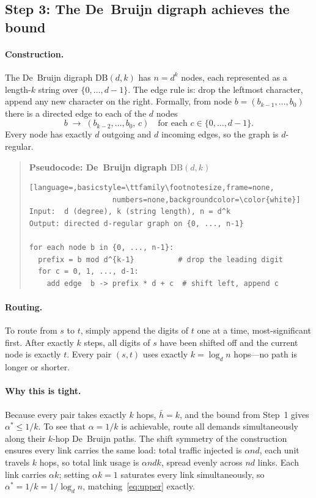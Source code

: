 \documentclass[11pt]{article}
\begin{document}
\subsection*{Step 3: The De~Bruijn digraph achieves the bound}

\paragraph{Construction.}
The De~Bruijn digraph $\mathrm{DB}(d,k)$ has $n = d^k$ nodes, each
represented as a length-$k$ string over $\{0,\ldots,d-1\}$. The edge
rule is: drop the leftmost character, append any new character on the
right. Formally, from node $b = (b_{k-1},\ldots,b_0)$ there is a
directed edge to each of the $d$ nodes
\[
b \;\longrightarrow\; (b_{k-2},\ldots,b_0,\,c) \quad \text{for each }
c \in \{0,\ldots,d-1\}.
\]
Every node has exactly $d$ outgoing and $d$ incoming edges, so the
graph is $d$-regular.

\begin{quote}\footnotesize
\textbf{Pseudocode: De~Bruijn digraph $\mathrm{DB}(d,k)$}
\begin{lstlisting}[language=,basicstyle=\ttfamily\footnotesize,frame=none,
                   numbers=none,backgroundcolor=\color{white}]
Input:  d (degree), k (string length), n = d^k
Output: directed d-regular graph on {0, ..., n-1}

for each node b in {0, ..., n-1}:
  prefix = b mod d^{k-1}          # drop the leading digit
  for c = 0, 1, ..., d-1:
    add edge  b -> prefix * d + c  # shift left, append c
\end{lstlisting}
\end{quote}

\paragraph{Routing.}
To route from $s$ to $t$, simply append the digits of $t$ one at a
time, most-significant first. After exactly $k$ steps, all digits of
$s$ have been shifted off and the current node is exactly $t$. Every
pair $(s,t)$ uses exactly $k = \log_d n$ hops---no path is longer or
shorter.

\paragraph{Why this is tight.}
Because every pair takes exactly $k$ hops, $\bar{h} = k$, and the
bound from Step~1 gives $\alpha^* \le 1/k$. To see that $\alpha = 1/k$
is achievable, route all demands simultaneously along their
$k$-hop De~Bruijn paths. The shift symmetry of the construction ensures
every link carries the same load: total traffic injected is $\alpha nd$,
each unit travels $k$ hops, so total link usage is $\alpha ndk$, spread
evenly across $nd$ links. Each link carries $\alpha k$; setting
$\alpha k = 1$ saturates every link simultaneously, so
$\alpha^* = 1/k = 1/\log_d n$, matching~\eqref{eq:upper} exactly.
\end{document}
